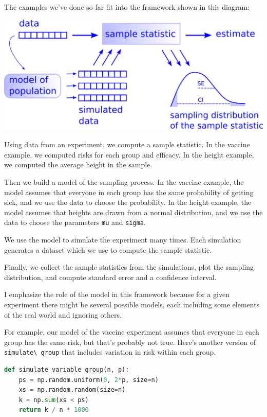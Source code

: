 The examples we've done so far fit into the framework shown in this
diagram:

\includegraphics{chapters/figs/resampling.png}

Using data from an experiment, we compute a sample statistic. In the
vaccine example, we computed risks for each group and efficacy. In the
height example, we computed the average height in the sample.

Then we build a model of the sampling process. In the vaccine example,
the model assumes that everyone in each group has the same probability
of getting sick, and we use the data to choose the probability. In the
height example, the model assumes that heights are drawn from a normal
distribution, and we use the data to choose the parameters
\passthrough{\lstinline!mu!} and \passthrough{\lstinline!sigma!}.

We use the model to simulate the experiment many times. Each simulation
generates a dataset which we use to compute the sample statistic.

Finally, we collect the sample statistics from the simulations, plot the
sampling distribution, and compute standard error and a confidence
interval.

I emphasize the role of the model in this framework because for a given
experiment there might be several possible models, each including some
elements of the real world and ignoring others.

For example, our model of the vaccine experiment assumes that everyone
in each group has the same risk, but that's probably not true. Here's
another version of \passthrough{\lstinline!simulate\_group!} that
includes variation in risk within each group.

\begin{lstlisting}[language=Python,style=source]
def simulate_variable_group(n, p):
    ps = np.random.uniform(0, 2*p, size=n)
    xs = np.random.random(size=n)
    k = np.sum(xs < ps)
    return k / n * 1000
\end{lstlisting}

